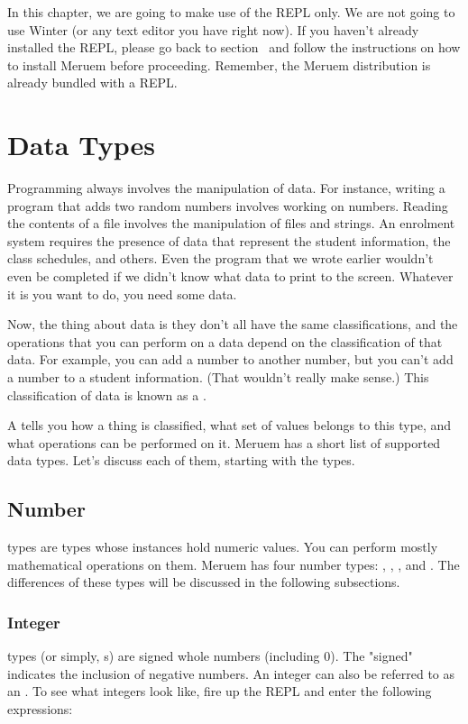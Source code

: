 In this chapter, we are going to make use of the REPL only. We are not going to use Winter (or any text editor you have right now). If you haven't already installed the REPL, please go back to section~ and follow the instructions on how to install Meruem before proceeding. Remember, the Meruem distribution is already bundled with a REPL.

\section{Data Types}
Programming always involves the manipulation of data. For instance, writing a program that adds two random numbers involves working on numbers. Reading the contents of a file involves the manipulation of files and strings. An enrolment system requires the presence of data that represent the student information, the class schedules, and others. Even the  program that we wrote earlier wouldn't even be completed if we didn't know what data to print to the screen. Whatever it is you want to do, you need some data.

Now, the thing about data is they don't all have the same classifications, and the operations that you can perform on a data depend on the classification of that data. For example, you can add a number to another number, but you can't add a number to a student information. (That wouldn't really make sense.) This classification of data is known as a .

A  tells you how a thing is classified, what set of values belongs to this type, and what operations can be performed on it. Meruem has a short list of supported data types. Let's discuss each of them, starting with the  types.

\subsection{Number}
 types are types whose instances hold numeric values. You can perform mostly mathematical operations on them. Meruem has four number types: , , , and . The differences of these types will be discussed in the following subsections.

\subsubsection{Integer}
 types (or simply, s) are signed whole numbers (including 0). The "signed" indicates the inclusion of negative numbers. An integer can also be referred to as an . To see what integers look like, fire up the REPL and enter the following expressions:

